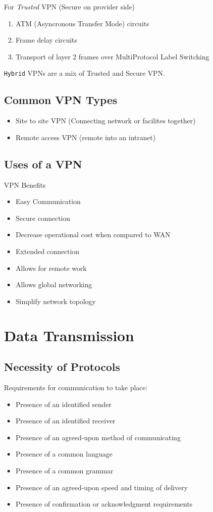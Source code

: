 \documentclass[../notes.tex]{subfiles}
\begin{document}
For \textit{Trusted} VPN (Secure on provider side)
\begin{enumerate}
	\item ATM (Asyncronous Transfer Mode) circuits
	\item Frame delay circuits
	\item Transport of layer 2 frames over MultiProtocol Label Switching
\end{enumerate}

\texttt{Hybrid} VPNs are a mix of Trusted and Secure VPN.

\subsection{Common VPN Types}
\begin{itemize}
	\item Site to site VPN (Connecting network or facilites together)
	\item Remote access VPN (remote into an intranet)
\end{itemize}

\subsection{Uses of a VPN}

VPN Benefits
\begin{itemize}
	\item Easy Communication
	\item Secure connection
	\item Decrease operational cost when compared to WAN
	\item Extended connection
	\item Allows for remote work
	\item Allows global networking
	\item Simplify network topology
\end{itemize}

\section{Data Transmission}
\subsection{Necessity of Protocols}
Requirements for communication to take place:
\begin{itemize}
	\item Presence of an identified sender
	\item Presence of an identified receiver
	\item Presence of an agreed-upon method of communicating
	\item Presence of a common language
	\item Presence of a common grammar
	\item Presence of an agreed-upon speed and timing of delivery
	\item Presence of confirmation or acknowledgment requirements
\end{itemize}
\end{document}

